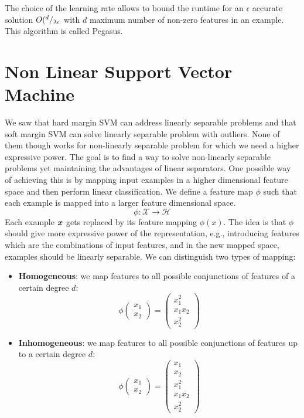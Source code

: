 The choice of the learning rate allows to bound the runtime for an $\epsilon$ accurate solution $O({}^{d}/_{\lambda\epsilon}$ with $d$ maximum number of non-zero features in an example. 
This algorithm is called Pegasus. 

\section{Non Linear Support Vector Machine}
We saw that hard margin SVM can address linearly separable problems and that soft margin SVM can solve linearly separable problem with outliers. None of them though works for non-linearly separable problem for which we need a higher expressive power. \newline
The goal is to find a way to solve non-linearly separable problems yet maintaining the advantages of linear separators. One possible way of achieving this is by mapping input examples in a higher dimensional feature space and then perform linear classification. \newline
We define a feature map $\phi$ such that each example is mapped into a larger feature dimensional space. 
\[\phi:\mathcal{X}\rightarrow \mathcal{H}\]
Each example $\bm{x}$ gets replaced by its feature mapping $\phi(x)$. \newline
The idea is that $\phi$ should give more expressive power of the representation, e.g., introducing features which are the combinations of input features, and in the new mapped space, examples should be linearly separable. \newline
We can distinguish two types of mapping:
\begin{itemize}
  \item \textbf{Homogeneous}: we map features to all possible conjunctions of features of a certain degree $d$:
    \[\phi 
      \begin{pmatrix}
        x_1\\x_2
      \end{pmatrix}=
      \begin{pmatrix}
        x_1^2\\
        x_1x_2\\
        x_2^2
      \end{pmatrix}
    \]
  \item \textbf{Inhomogeneous}: we map features to all possible conjunctions of features up to a certain degree $d$:
    \[\phi 
      \begin{pmatrix}
        x_1\\x_2
      \end{pmatrix}=
      \begin{pmatrix}
        x_1\\
        x_2\\
        x_1^2\\
        x_1x_2\\
        x_2^2
      \end{pmatrix}
    \]
\end{itemize}
